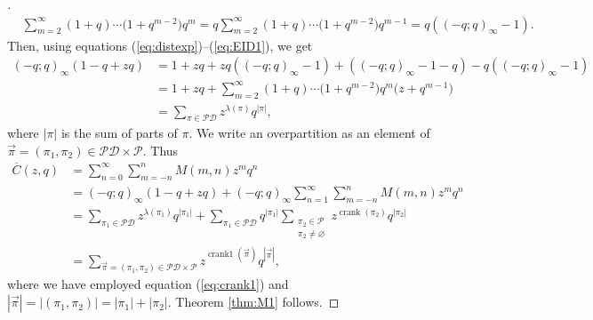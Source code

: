 \documentclass[pdftex]{sigma}
\numberwithin{equation}{section}
\newcommand\mylabel[1]{\label{#1}}
\newcommand\thm[1]{\ref{thm:#1}}
\newcommand\eqn[1]{(\ref{eq:#1})}
\begin{document}
\begin{proof}[\unskip\nopunct]
\begin{align}
\mylabel{eq:EID1}
&\sum\limits_{m=2}^{\infty}(1+q)\cdots\bigl(1+q^{m-2}\bigr)q^m=q\sum\limits_{m=2}^{\infty}(1+q)\cdots\bigl(1+q^{m-2}\bigr)q^{m-1}=q((-q;q)_{\infty}-1).
\end{align}
Then, using equations \eqn{distexp}--\eqn{EID1}, we get
\begin{align*}
(-q;q)_{\infty}(1-q+zq)&{}=1+zq+zq ((-q;q)_{\infty}-1)+((-q;q)_{\infty}-1-q)-q((-q;q)_{\infty}-1)
\\
&{}=1+zq+\sum\limits_{m=2}^{\infty}(1+q)\cdots\bigl(1+q^{m-2}\bigr)q^m\bigl(z+q^{m-1}\bigr)
\\
&{}=\sum\limits_{\pi \in \mathcal{PD}}z^{\lambda(\pi)}q^{|\pi|},
\end{align*}
where $|\pi|$ is the sum of parts of $\pi$. We write an overpartition as an element of $\vec{\pi}=(\pi_1,\pi_2) \in \mathcal{PD} \times \mathcal{P}$. Thus
\begin{align*}
\overline{C}(z,q)&{}=\sum_{n=0}^\infty \sum_{m=-n}^n M(m,n) z^m q^n
\\
&{}=(-q;q)_{\infty}(1-q+zq)+(-q;q)_{\infty}\sum_{n=1}^\infty
\sum_{m=-n}^n M(m,n) z^m q^n
\\
&{}=\sum\limits_{\pi_1 \in \mathcal{PD}}z^{\lambda(\pi_1)}q^{|\pi_1|}+\sum\limits_{\pi_1 \in \mathcal{PD}}q^{|\pi_1|}\sum\limits_{\substack{\pi_2 \in \mathcal{P}\\ \pi_2 \neq \varnothing}}z^{\operatorname{crank}(\pi_2)}q^{|\pi_2|}
\\
&{}=\sum\limits_{\vec{\pi} = (\pi_1,\pi_2) \in \mathcal{PD}\times \mathcal{P}}z^{\operatorname{crank1}(\vec{\pi})}q^{|\vec{\pi}|},
\end{align*}
where we have employed equation \eqn{crank1} and $|\vec{\pi}|=|(\pi_1,\pi_2)|=|\pi_1|+|\pi_2|.$ Theorem \thm{M1} follows.
\end{proof}
\end{document}
